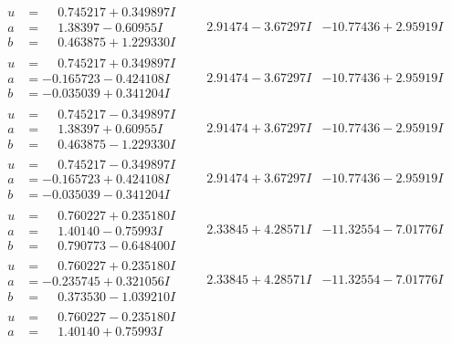 \documentclass[1p]{elsarticle_modified}
\theoremstyle{definition}
\begin{document}
$$\begin{array}{c|c|c}
\begin{aligned}
u &= \phantom{-}0.745217 + 0.349897 I \\
a &= \phantom{-}1.38397 - 0.60955 I \\
b &= \phantom{-}0.463875 + 1.229330 I\end{aligned}
 & \phantom{-}2.91474 - 3.67297 I & -10.77436 + 2.95919 I \\ \hline\begin{aligned}
u &= \phantom{-}0.745217 + 0.349897 I \\
a &= -0.165723 - 0.424108 I \\
b &= -0.035039 + 0.341204 I\end{aligned}
 & \phantom{-}2.91474 - 3.67297 I & -10.77436 + 2.95919 I \\ \hline\begin{aligned}
u &= \phantom{-}0.745217 - 0.349897 I \\
a &= \phantom{-}1.38397 + 0.60955 I \\
b &= \phantom{-}0.463875 - 1.229330 I\end{aligned}
 & \phantom{-}2.91474 + 3.67297 I & -10.77436 - 2.95919 I \\ \hline\begin{aligned}
u &= \phantom{-}0.745217 - 0.349897 I \\
a &= -0.165723 + 0.424108 I \\
b &= -0.035039 - 0.341204 I\end{aligned}
 & \phantom{-}2.91474 + 3.67297 I & -10.77436 - 2.95919 I \\ \hline\begin{aligned}
u &= \phantom{-}0.760227 + 0.235180 I \\
a &= \phantom{-}1.40140 - 0.75993 I \\
b &= \phantom{-}0.790773 - 0.648400 I\end{aligned}
 & \phantom{-}2.33845 + 4.28571 I & -11.32554 - 7.01776 I \\ \hline\begin{aligned}
u &= \phantom{-}0.760227 + 0.235180 I \\
a &= -0.235745 + 0.321056 I \\
b &= \phantom{-}0.373530 - 1.039210 I\end{aligned}
 & \phantom{-}2.33845 + 4.28571 I & -11.32554 - 7.01776 I \\ \hline\begin{aligned}
u &= \phantom{-}0.760227 - 0.235180 I \\
a &= \phantom{-}1.40140 + 0.75993 I \\

\end{aligned}
\end{array}$$
\end{document}
